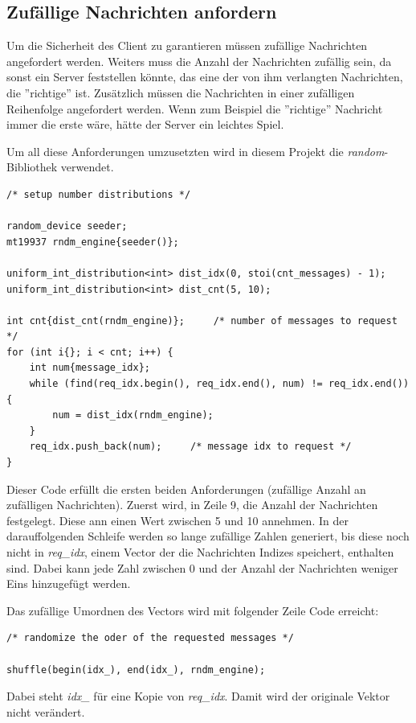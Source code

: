 \documentclass[]{article}
\begin{document}
\subsection{Zufällige Nachrichten anfordern}
Um die Sicherheit des Client zu garantieren müssen zufällige Nachrichten angefordert werden. Weiters muss die Anzahl der Nachrichten zufällig sein, da sonst ein Server feststellen könnte, das eine der von ihm verlangten Nachrichten, die ''richtige'' ist. Zusätzlich müssen die Nachrichten in einer zufälligen Reihenfolge angefordert werden. Wenn zum Beispiel die ''richtige'' Nachricht immer die erste wäre, hätte der Server ein leichtes Spiel.

Um all diese Anforderungen umzusetzten wird in diesem Projekt die \textit{random}-Bibliothek verwendet.

\begin{lstlisting}
/* setup number distributions */

random_device seeder;
mt19937 rndm_engine{seeder()};

uniform_int_distribution<int> dist_idx(0, stoi(cnt_messages) - 1);
uniform_int_distribution<int> dist_cnt(5, 10);

int cnt{dist_cnt(rndm_engine)};     /* number of messages to request */
for (int i{}; i < cnt; i++) {
	int num{message_idx};
	while (find(req_idx.begin(), req_idx.end(), num) != req_idx.end()) {
		num = dist_idx(rndm_engine);
	}
	req_idx.push_back(num);     /* message idx to request */
}
\end{lstlisting}

Dieser Code erfüllt die ersten beiden Anforderungen (zufällige Anzahl an zufälligen Nachrichten). Zuerst wird, in Zeile 9, die Anzahl der Nachrichten festgelegt. Diese ann einen Wert zwischen 5 und 10 annehmen. In der darauffolgenden Schleife werden so lange zufällige Zahlen generiert, bis diese noch nicht in \textit{req\_idx}, einem Vector der die Nachrichten Indizes speichert, enthalten sind. Dabei kann jede Zahl zwischen 0 und der Anzahl der Nachrichten weniger Eins hinzugefügt werden.

Das zufällige Umordnen des Vectors wird mit folgender Zeile Code erreicht:

\begin{lstlisting}
/* randomize the oder of the requested messages */

shuffle(begin(idx_), end(idx_), rndm_engine);
\end{lstlisting}

Dabei steht \textit{idx\_} für eine Kopie von \textit{req\_idx}. Damit wird der originale Vektor nicht verändert.
\end{document}
